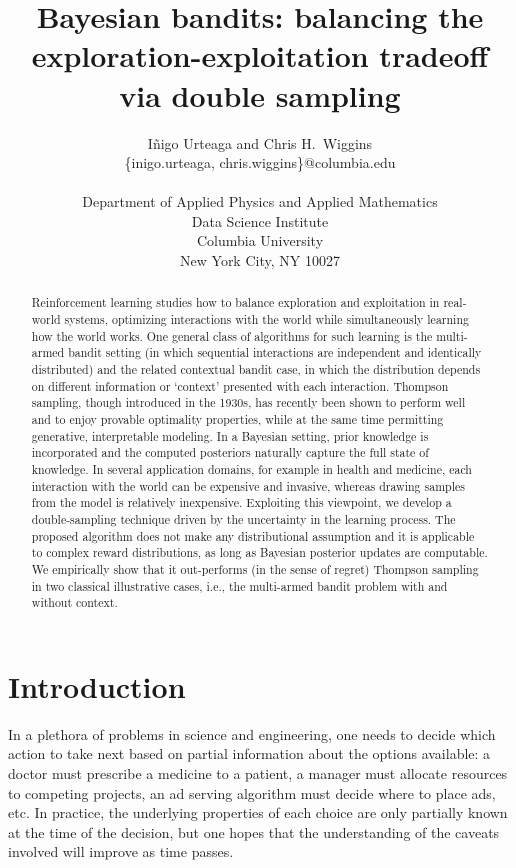 \documentclass[10pt]{article}
\title{Bayesian bandits: balancing the exploration-exploitation tradeoff via double sampling}
\author{ I\~{n}igo Urteaga and Chris H.~Wiggins\\
	{\sf \{inigo.urteaga, chris.wiggins\}@columbia.edu} \\\\
  Department of	Applied Physics and Applied Mathematics\\
	Data Science Institute\\
	Columbia University\\
	New York City, NY 10027
}
\newcommand{\ie}{i.e., }
\begin{document}
\maketitle

\begin{abstract}
Reinforcement learning studies how to balance exploration and exploitation in real-world systems, optimizing interactions with the world while simultaneously learning how the world works. One general class of algorithms for such learning is the multi-armed bandit setting (in which sequential interactions are independent and identically distributed) and the related contextual bandit case, in which the distribution depends on different information or `context' presented with each interaction. Thompson sampling, though introduced in the 1930s, has recently been shown to perform well and to enjoy provable optimality properties, while at the same time permitting generative, interpretable modeling. In a Bayesian setting, prior knowledge is incorporated and the computed posteriors naturally capture the full state of knowledge. In several application domains, for example in health and medicine, each interaction with the world can be expensive and invasive, whereas drawing samples from the model is relatively inexpensive. Exploiting this viewpoint, we develop a double-sampling technique driven by the uncertainty in the learning process. The proposed algorithm does not make any distributional assumption and it is applicable to complex reward distributions, as long as Bayesian posterior updates are computable. We empirically show that it out-performs (in the sense of regret) Thompson sampling in two classical illustrative cases, \ie the multi-armed bandit problem with and without context.
\end{abstract}

\section{Introduction}
\label{sec:introduction}

In a plethora of problems in science and engineering, one needs to decide which action to take next based on partial information about the options available: a doctor must prescribe a medicine to a patient, a manager must allocate resources to competing projects, an ad serving algorithm must decide where to place ads, etc. In practice, the underlying properties of each choice are only partially known at the time of the decision, but one hopes that the understanding of the caveats involved will improve as time passes.
\end{document}
